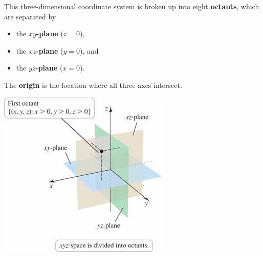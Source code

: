 \documentclass[../mathNotesPreamble]{subfiles}
\begin{document}
    \begin{defn*}
      \begin{minipage}{0.5\linewidth}
        This three-dimensional coordinate system is broken up into eight \textbf{octants}, which are separated by
        \begin{itemize}
          \item the \textbf{$xy$-plane} ($z=0$),
          \item the \textbf{$xz$-plane} ($y=0$), and
          \item the \textbf{$yz$-plane} ($x=0$).
        \end{itemize}
           The \textbf{origin} is the location where all three axes intersect.
      \end{minipage}%
      \begin{minipage}{0.5\linewidth}
        \vspace*{-\baselineskip}
        \begin{flushright}
          \includegraphics[width=0.85\linewidth]{../images/briggs_13_02/fig13_26}
        \end{flushright}
      \end{minipage}%
    \end{defn*}
    \pagebreak
\end{document}
